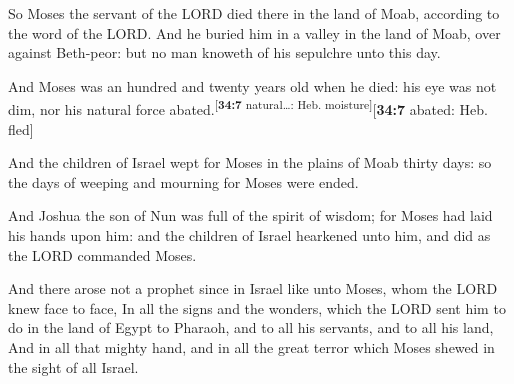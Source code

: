  So Moses the servant of the LORD died there in the land
of Moab, according to the word of the LORD.  And he buried
him in a valley in the land of Moab, over against Beth-peor: but no man
knoweth of his sepulchre unto this day.

 And Moses was an hundred and twenty years old when he
died: his eye was not dim, nor his natural force
abated.\textsuperscript{{[}\textbf{34:7} natural\ldots: Heb.
moisture{]}}{[}\textbf{34:7} abated: Heb. fled{]}

 And the children of Israel wept for Moses in the plains
of Moab thirty days: so the days of weeping and mourning for Moses were
ended.

 And Joshua the son of Nun was full of the spirit of
wisdom; for Moses had laid his hands upon him: and the children of
Israel hearkened unto him, and did as the LORD commanded Moses.

 And there arose not a prophet since in Israel like unto
Moses, whom the LORD knew face to face,  In all the signs
and the wonders, which the LORD sent him to do in the land of Egypt to
Pharaoh, and to all his servants, and to all his land, 
And in all that mighty hand, and in all the great terror which Moses
shewed in the sight of all Israel.
